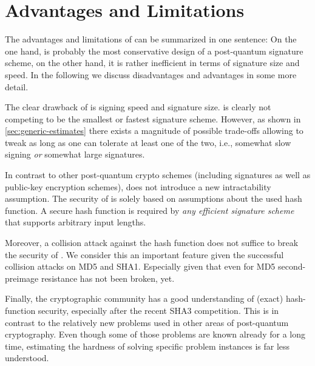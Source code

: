 \section{Advantages and Limitations}
\label{sec:discussion}
%
%
The advantages and limitations of \spx can be summarized in one sentence:
On the one hand, \spx is probably the most conservative design of a post-quantum
signature scheme, on the other hand, it is rather inefficient in terms of signature
size and speed. In the following we discuss disadvantages and advantages in
some more detail.

The clear drawback of \spx is signing speed and signature size. \spx is clearly 
not competing to be the smallest or fastest signature scheme. However, as shown 
in \autoref{sec:generic-estimates} there exists a magnitude of possible 
trade-offs allowing to tweak \spx as long as one can tolerate at least one 
of the two, i.e., somewhat slow signing \emph{or} somewhat large signatures.


 In contrast to other post-quantum
crypto schemes (including signatures as well as public-key encryption schemes), 
\spx does not introduce a new intractability assumption. The security of \spx
is solely based on assumptions about the used hash function. 
A secure hash function is required by \emph{any efficient signature scheme} 
that supports arbitrary input lengths.

Moreover, a collision attack against the hash function does not suffice to 
break the security of \spx. We consider this an important feature given the 
successful collision attacks on MD5 and SHA1. Especially given that even for 
MD5 second-preimage resistance has not been broken, yet.

Finally, the cryptographic community has a good
understanding of (exact) hash-function security, especially after the recent SHA3 
competition.  This is in contrast to the relatively new problems used in 
other areas of post-quantum cryptography. Even though some of those problems are
known already for a long time, estimating the hardness of solving specific 
problem instances is far less understood.

